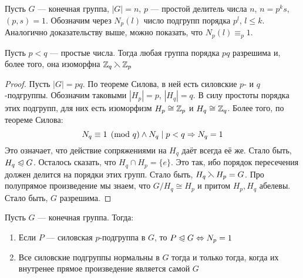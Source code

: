 \begin{note}
	Пусть $G$ --- конечная группа, $|G| = n$, $p$ --- простой делитель числа $n$, $n = p^ks$, $(p, s) = 1$. Обозначим через $N_p(l)$ число подгрупп порядка $p^l$, $l \le k$. Аналогично доказательству выше, можно показать, что $N_p(l) \equiv_p 1$.
\end{note}

\begin{proposition}
	Пусть $p < q$ --- простые числа. Тогда любая группа порядка $pq$ разрешима и, более того, она изоморфна $\mathbb{Z}_q \leftthreetimes \mathbb{Z}_p$
\end{proposition}

\begin{proof}
	Пусть $|G| = pq$. По теореме Силова, в ней есть силовские $p$- и $q$-подгруппы. Обозначим таковыми $|H_p| = p$, $|H_q| = q$. В силу простоты порядка этих подгрупп, для них есть изоморфизм $H_p \cong \mathbb{Z}_p$ и $H_q \cong \mathbb{Z}_q$. Более того, по теореме Силова:
	\[
		N_q \equiv 1 \pmod q \wedge N_q \mid p < q \Rightarrow N_q = 1
	\]
	Это означает, что действие сопряжениями на $H_q$ даёт всегда её же. Стало быть, $H_q \trianglelefteqslant G$. Осталось сказать, что $H_q \cap H_p = \{e\}$. Это так, ибо порядок пересечения должен делится на порядки этих групп. Стало быть, $H_q \leftthreetimes H_p = G$. Про полупрямое произведение мы знаем, что $G / H_q \cong H_p$ и притом $H_p, H_q$ абелевы. Стало быть, $G$ разрешима.
\end{proof}

\begin{theorem} Пусть $G$ --- конечная группа. Тогда:
	\begin{enumerate}
		\item Если $P$ --- силовская $p$-подгруппа в $G$, то $P \trianglelefteqslant G \Leftrightarrow N_p = 1$
		
		\item Все силовские подгруппы нормальны в $G$ тогда и только тогда, когда их внутренее прямое произведение является самой $G$
	\end{enumerate}
\end{theorem}

